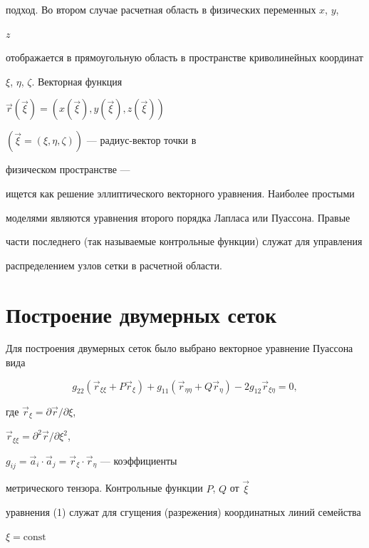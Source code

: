 подход. Во втором случае расчетная область в физических переменных $x$, $y$, 


$z$ 


отображается в прямоугольную область в пространстве криволинейных координат 


$\xi$, $\eta$, $\zeta$. Векторная функция 


${\Vec r}({\Vec\xi})=(x({\Vec\xi}),y({\Vec\xi}),z({\Vec\xi}))$ 


$(\Vec \xi=(\xi,\eta,\zeta))$ --- радиус-вектор точки в 


физическом пространстве --- 


ищется как решение эллиптического векторного уравнения. Наиболее простыми 


моделями являются уравнения второго порядка Лапласа или Пуассона. Правые 


части последнего (так называемые контрольные функции) служат для управления 


распределением узлов сетки в расчетной области. 


 


\section{Построение двумерных сеток} 


 


Для построения двумерных сеток было выбрано векторное уравнение Пуассона вида 


\cite{Tom} 


\begin{equation} 


g_{22}(\Vec r_{\xi\xi}+P\Vec r_\xi)+g_{11}(\Vec r_{\eta\eta} 


+Q\Vec r_\eta)-2g_{12}\Vec r_{\xi\eta}=0, 


\end{equation} 


где $\Vec r_\xi=\partial\Vec r/\partial\xi$, 


$\Vec r_{\xi\xi}=\partial^2\Vec r/\partial\xi^2$, 


$g_{ij}=\Vec a_i\cdot\Vec a_j=\Vec r_\xi\cdot\Vec r_\eta$ --- коэффициенты 


метрического тензора. Контрольные функции $P$, $Q$ от $\Vec\xi$ 


уравнения (1) служат для сгущения (разрежения) координатных линий семейства 


$\xi=\text{const}$ 


